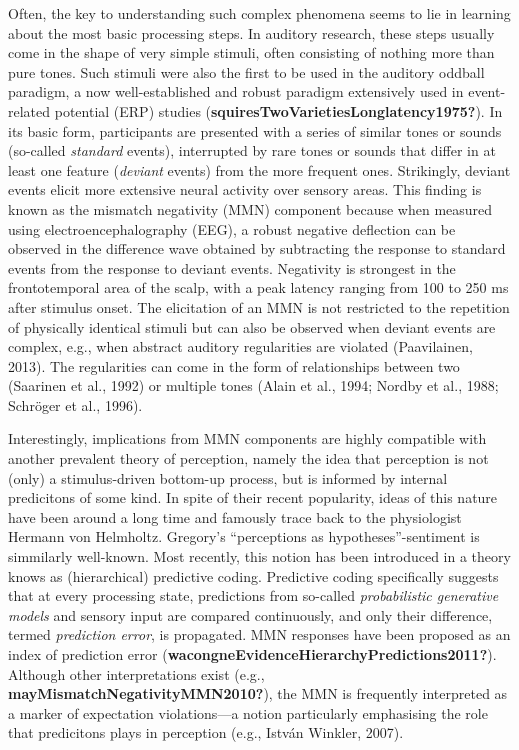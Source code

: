\documentclass[twoside, man, a4paper,12pt, nofontenc]{apa7}
\begin{document}
Often, the key to understanding such complex phenomena seems to lie in
learning about the most basic processing steps. In auditory research,
these steps usually come in the shape of very simple stimuli, often
consisting of nothing more than pure tones. Such stimuli were also the
first to be used in the auditory oddball paradigm, a now
well-established and robust paradigm extensively used in event-related
potential (ERP) studies (\textbf{squiresTwoVarietiesLonglatency1975?}).
In its basic form, participants are presented with a series of similar
tones or sounds (so-called \emph{standard} events), interrupted by rare
tones or sounds that differ in at least one feature (\emph{deviant}
events) from the more frequent ones. Strikingly, deviant events elicit
more extensive neural activity over sensory areas. This finding is known
as the mismatch negativity (MMN) component because when measured using
electroencephalography (EEG), a robust negative deflection can be
observed in the difference wave obtained by subtracting the response to
standard events from the response to deviant events. Negativity is
strongest in the frontotemporal area of the scalp, with a peak latency
ranging from 100 to 250 ms after stimulus onset. The elicitation of an
MMN is not restricted to the repetition of physically identical stimuli
but can also be observed when deviant events are complex, e.g., when
abstract auditory regularities are violated (Paavilainen, 2013). The
regularities can come in the form of relationships between two (Saarinen
et al., 1992) or multiple tones (Alain et al., 1994; Nordby et al.,
1988; Schröger et al., 1996).

Interestingly, implications from MMN components are highly compatible
with another prevalent theory of perception, namely the idea that
perception is not (only) a stimulus-driven bottom-up process, but is
informed by internal predicitons of some kind. In spite of their recent
popularity, ideas of this nature have been around a long time and
famously trace back to the physiologist Hermann von Helmholtz. Gregory's
\enquote{perceptions as hypotheses}-sentiment is simmilarly well-known.
Most recently, this notion has been introduced in a theory knows as
(hierarchical) predictive coding. Predictive coding specifically
suggests that at every processing state, predictions from so-called
\emph{probabilistic generative models} and sensory input are compared
continuously, and only their difference, termed \emph{prediction error},
is propagated. MMN responses have been proposed as an index of
prediction error (\textbf{wacongneEvidenceHierarchyPredictions2011?}).
Although other interpretations exist (e.g.,
\textbf{mayMismatchNegativityMMN2010?}), the MMN is frequently
interpreted as a marker of expectation violations---a notion
particularly emphasising the role that predicitons plays in perception
(e.g., István Winkler, 2007).
\end{document}
